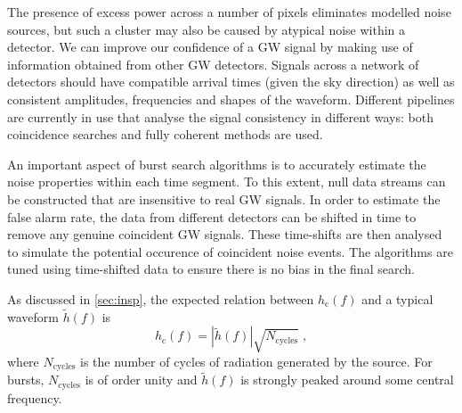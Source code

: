 The presence of excess power across a number of pixels eliminates modelled noise sources, but such a cluster may also be caused by atypical noise within a detector. We can improve our confidence of a GW signal by making use of information obtained from other GW detectors. Signals across a network of detectors should have compatible arrival times (given the sky direction) as well as consistent amplitudes, frequencies and shapes of the waveform. Different pipelines are currently in use that analyse the signal consistency in different ways: both coincidence searches \citep{Chatterji2004} and fully coherent methods \citep{Klimenko2008} are used.

An important aspect of burst search algorithms is to accurately estimate the noise properties within each time segment. To this extent, null data streams can be constructed that are insensitive to real GW signals. In order to estimate the false alarm rate, the data from different detectors can be shifted in time to remove any genuine coincident GW signals. These time-shifts are then analysed to simulate the potential occurence of coincident noise events. The algorithms are tuned using time-shifted data to ensure there is no bias in the final search.

As discussed in \ref{sec:insp}, the expected relation between $h_\mathrm{c}(f)$ and a typical waveform $\tilde{h}(f)$ is
\begin{equation}\label{eq:simple} 
h_\mathrm{c}(f) = \left|\tilde{h}(f)\right|\sqrt{{N}_{\mathrm{cycles}}} \; , 
\end{equation}
where ${N}_{\mathrm{cycles}}$ is the number of cycles of radiation generated by the source. For bursts, $N_{\mathrm{cycles}}$ is of order unity and $\tilde{h}(f)$ is strongly peaked around some central frequency.


